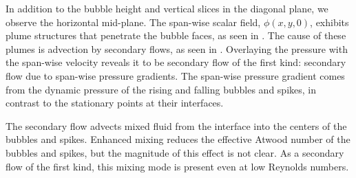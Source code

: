 In addition to the bubble height and vertical slices in the diagonal plane, we observe the horizontal mid-plane.
The span-wise scalar field, $\phi(x,y,0)$, exhibits plume structures that penetrate the bubble faces, as seen in .
The cause of these plumes is advection by secondary flows, as seen in .
Overlaying the pressure with the span-wise velocity reveals it to be secondary flow of the first kind: secondary flow due to span-wise pressure gradients.
The span-wise pressure gradient comes from the dynamic pressure of the rising and falling bubbles and spikes, in contrast to the stationary points at their interfaces.

The secondary flow advects mixed fluid from the interface into the centers of the bubbles and spikes.
Enhanced mixing reduces the effective Atwood number of the bubbles and spikes, but the magnitude of this effect is not clear.
As a secondary flow of the first kind, this mixing mode is present even at low Reynolds numbers.


